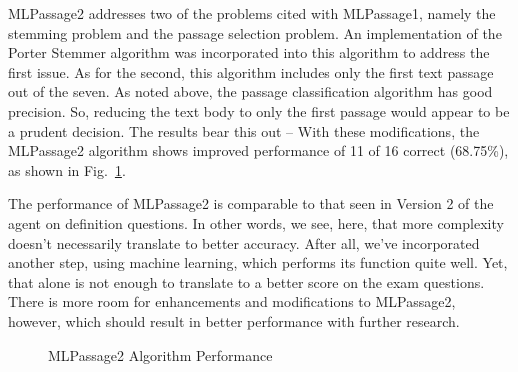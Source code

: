 MLPassage2 addresses two of the problems cited with MLPassage1, namely the stemming problem and the passage selection problem.  An implementation of the Porter Stemmer algorithm was incorporated into this algorithm to address the first issue.  As for the second, this algorithm includes only the first text passage out of the seven.  As noted above, the passage classification algorithm has good precision.  So, reducing the text body to only the first passage would appear to be a prudent decision.  The results bear this out -- With these modifications, the MLPassage2 algorithm shows improved performance of 11 of 16 correct (68.75\%), as shown in Fig.~\ref{fig:mlpassage2_performance}.  

The performance of MLPassage2 is comparable to that seen in Version 2 of the agent on definition questions.  In other words, we see, here, that more complexity doesn't necessarily translate to better accuracy.   After all, we've incorporated another step, using machine learning, which performs its function quite well.  Yet, that alone is not enough to translate to a better score on the exam questions.  There is more room for enhancements and modifications to MLPassage2, however, which should result in better performance with further research.  

\begin{figure}
\centering
\vspace{1.0in}
\caption{MLPassage2 Algorithm Performance}
\label{fig:mlpassage2_performance}
\end{figure}





















